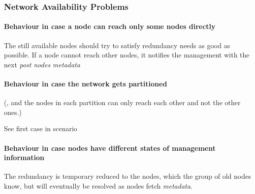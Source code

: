 \subsubsection{Network Availability Problems}\label{sec:scenario-network-errors}
\paragraph{Behaviour in case a node can reach only some nodes directly}
The still available nodes should try to satisfy redundancy needs as good as possible.
If a node cannot reach other nodes, it notifies the management with the next \emph{post nodes metadata}

\paragraph{Behaviour in case the network gets partitioned}
(, and the nodes in each partition can only reach each other and not the other ones.)

See first case in scenario~

\paragraph{Behaviour in case nodes have different states of management information}
The redundancy is temporary reduced to the nodes, which the group of old nodes know, but will eventually be resolved as nodes fetch \emph{metadata}. %